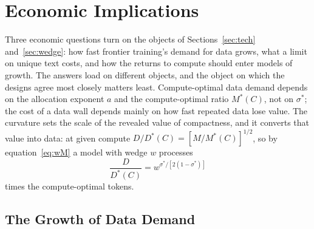 
\section{Economic Implications}\label{sec:econ}

Three economic questions turn on the objects of Sections~\ref{sec:tech} and~\ref{sec:wedge}: how fast frontier
training's demand for data grows, what a limit on unique text costs, and how the returns to compute should enter models
of growth. The answers load on different objects, and the object on which the designs agree most closely matters least.
Compute-optimal data demand depends on the allocation exponent $a$ and the compute-optimal ratio $M^*(C)$, not on
$\sigma^*$; the cost of a data wall depends mainly on how fast repeated data lose value. The curvature sets the scale of
the revealed value of compactness, and it converts that value into data: at given compute $D/D^*(C)=[M/M^*(C)]^{1/2}$,
so by equation~\eqref{eq:wM} a model with wedge $w$ processes
\begin{equation}\label{eq:econ-DD}
\frac{D}{D^*(C)}=w^{\sigma^*/[2(1-\sigma^*)]}
\end{equation}
times the compute-optimal tokens.

\subsection{The Growth of Data Demand}\label{sec:econ-demand}

